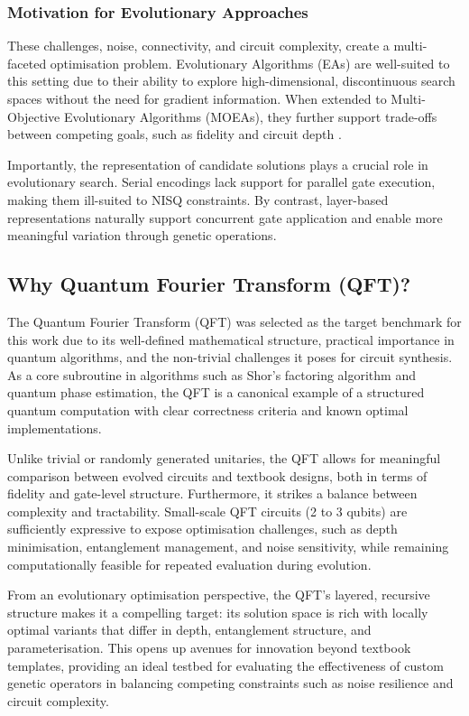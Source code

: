 \documentclass[11pt,a4paper]{article}
\begin{document}
\subsubsection*{Motivation for Evolutionary Approaches}
These challenges, noise, connectivity, and circuit complexity, create a multi-faceted optimisation problem. Evolutionary Algorithms (EAs) are well-suited to this setting due to their ability to explore high-dimensional, discontinuous search spaces without the need for gradient information. When extended to Multi-Objective Evolutionary Algorithms (MOEAs), they further support trade-offs between competing goals, such as fidelity and circuit depth \cite{moein, Zhou2011MultiobjectiveEA}.\newline

Importantly, the representation of candidate solutions plays a crucial role in evolutionary search. Serial encodings lack support for parallel gate execution, making them ill-suited to NISQ constraints. By contrast, layer-based representations naturally support concurrent gate application and enable more meaningful variation through genetic operations.

\subsection{Why Quantum Fourier Transform (QFT)?}
The Quantum Fourier Transform (QFT) was selected as the target benchmark for this work due to its well-defined mathematical structure, practical importance in quantum algorithms, and the non-trivial challenges it poses for circuit synthesis. As a core subroutine in algorithms such as Shor’s factoring algorithm and quantum phase estimation, the QFT is a canonical example of a structured quantum computation with clear correctness criteria and known optimal implementations.\newline

Unlike trivial or randomly generated unitaries, the QFT allows for meaningful comparison between evolved circuits and textbook designs, both in terms of fidelity and gate-level structure. Furthermore, it strikes a balance between complexity and tractability. Small-scale QFT circuits (2 to 3 qubits) are sufficiently expressive to expose optimisation challenges, such as depth minimisation, entanglement management, and noise sensitivity, while remaining computationally feasible for repeated evaluation during evolution.\newline

From an evolutionary optimisation perspective, the QFT's layered, recursive structure makes it a compelling target: its solution space is rich with locally optimal variants that differ in depth, entanglement structure, and parameterisation. This opens up avenues for innovation beyond textbook templates, providing an ideal testbed for evaluating the effectiveness of custom genetic operators in balancing competing constraints such as noise resilience and circuit complexity.
\end{document}
